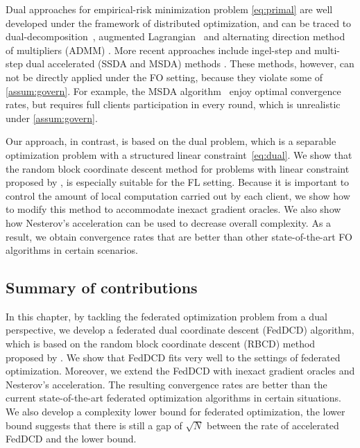 Dual approaches for empirical-risk minimization problem \eqref{eq:primal} are well developed under the framework of distributed optimization, and can be traced to dual-decomposition~\citep{zeng2008fast,joachims1999making}, augmented Lagrangian~ \citep{jakovetic2014linear} and alternating direction method of multipliers (ADMM) \citep{boyd2011distributed,wei2012distributed}. More recent approaches include ingel-step and multi-step dual accelerated (SSDA and MSDA) methods \citep{Scaman2017OptimalAF}. These methods, however, can not be directly applied under the FO setting, because they violate some of \autoref{assum:govern}. For example, the MSDA algorithm~\citep{Scaman2017OptimalAF} enjoy optimal convergence rates, but requires full clients participation in every round, which is unrealistic under \autoref{assum:govern}. 

Our approach, in contrast, is based on the dual problem, which is a separable optimization problem with a structured linear constraint~\eqref{eq:dual}. We show that the random block coordinate descent method for problems with linear constraint proposed by \citet{necoara2017random}, is especially suitable for the FL setting. Because it is important to control the amount of local computation carried out by each client, we show how to modify this method to accommodate inexact gradient oracles. We also show how Nesterov's acceleration can be used to decrease overall complexity. As a result, we obtain convergence rates that are better than other state-of-the-art FO algorithms in certain scenarios. 

\subsection{Summary of contributions}

In this chapter, by tackling the federated optimization problem from a dual perspective, we develop a federated dual coordinate descent (FedDCD) algorithm, which is based on the random block coordinate descent (RBCD) method proposed by \citet{necoara2017random}. We show that FedDCD fits very well to the settings of federated optimization. Moreover, we extend the FedDCD with inexact gradient oracles and Nesterov's acceleration. The resulting convergence rates are better than the current state-of-the-art federated optimization algorithms in certain situations. We also develop a complexity lower bound for federated optimization, the lower bound suggests that there is still a gap of $\sqrt{N}$ between the rate of accelerated FedDCD and the lower bound.

